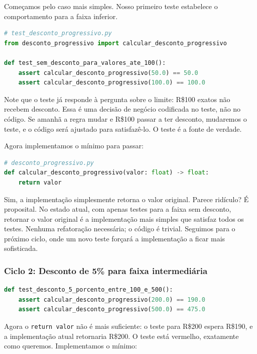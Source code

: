 Começamos pelo caso mais simples. Nosso primeiro teste estabelece o
comportamento para a faixa inferior.

\begin{lstlisting}[language=Python, caption={Ciclo 1 --- Red: teste para valor sem desconto}]
# test_desconto_progressivo.py
from desconto_progressivo import calcular_desconto_progressivo

def test_sem_desconto_para_valores_ate_100():
    assert calcular_desconto_progressivo(50.0) == 50.0
    assert calcular_desconto_progressivo(100.0) == 100.0
\end{lstlisting}

Note que o teste já responde à pergunta sobre o limite: R\$100 exatos não
recebem desconto. Essa é uma decisão de negócio codificada no teste, não no
código. Se amanhã a regra mudar e R\$100 passar a ter desconto, mudaremos o
teste, e o código será ajustado para satisfazê-lo. O teste é a fonte de
verdade.

Agora implementamos o mínimo para passar:

\begin{lstlisting}[language=Python, caption={Ciclo 1 --- Green: implementação mínima}]
# desconto_progressivo.py
def calcular_desconto_progressivo(valor: float) -> float:
    return valor
\end{lstlisting}

Sim, a implementação simplesmente retorna o valor original. Parece ridículo?
É proposital. No estado atual, com apenas testes para a faixa sem desconto,
retornar o valor original é a implementação mais simples que satisfaz todos os
testes. Nenhuma refatoração necessária; o código é trivial. Seguimos para o
próximo ciclo, onde um novo teste forçará a implementação a ficar mais
sofisticada.

\subsubsection{Ciclo 2: Desconto de 5\% para faixa intermediária}

\begin{lstlisting}[language=Python, caption={Ciclo 2 --- Red: teste para faixa intermediária}]
def test_desconto_5_porcento_entre_100_e_500():
    assert calcular_desconto_progressivo(200.0) == 190.0
    assert calcular_desconto_progressivo(500.0) == 475.0
\end{lstlisting}

Agora o \texttt{return valor} não é mais suficiente: o teste para R\$200
espera R\$190, e a implementação atual retornaria R\$200. O teste está
vermelho, exatamente como queremos. Implementamos o mínimo:

